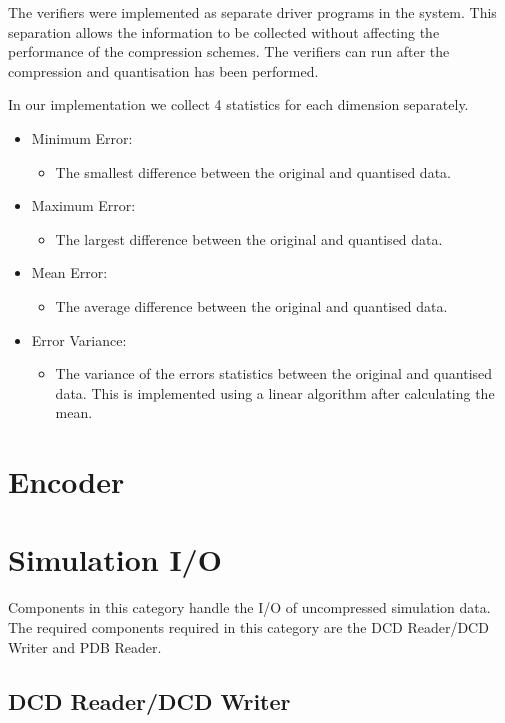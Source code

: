 \documentclass[a4paper,11pt]{report}
\begin{document}
The verifiers were implemented as separate driver programs in the system. This separation allows the information to be collected without affecting the performance of the compression schemes. The verifiers can run after the compression and quantisation has been performed.

In our implementation we collect 4 statistics for each dimension separately.
\begin{itemize}
 \item Minimum Error: 
 \begin{itemize}
   \item The smallest difference between the original and quantised data.
 \end{itemize}
 \item Maximum Error:
 \begin{itemize}
   \item The largest difference between the original and quantised data.
 \end{itemize}
 \item Mean Error:
 \begin{itemize}
   \item The average difference between the original and quantised data.
 \end{itemize}
 \item Error Variance:
 \begin{itemize}
   \item The variance of the errors statistics between the original and quantised data. This is implemented using a linear algorithm after calculating the mean.
 \end{itemize}
\end{itemize}


\section{Encoder}





\section{Simulation I/O}

Components in this category handle the I/O of uncompressed simulation data. The required components required in this category are the DCD Reader/DCD Writer and PDB Reader.

\subsection{DCD Reader/DCD Writer}
\end{document}
